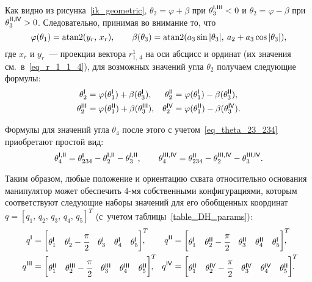 Как видно из рисунка~\ref{ik_geometric}, $\theta_2 = \varphi + \beta$ при $\theta_3^{\mathsf{I,III}} < 0$ и $\theta_2 = \varphi - \beta$ при $\theta_3^{\mathsf{II,IV}} > 0$.
Следовательно, принимая во внимание то, что
\begin{equation}
    \varphi(\theta_1) = \atan2(y_r,\, x_r),
    \qquad
    \beta(\theta_3) = \atan2(a_3\sin|\theta_3|,\: a_2 + a_3\cos|\theta_3|),
\end{equation}
где $x_r$ и $y_r$~--- проекции вектора $r^1_{1,\,4}$ на оси абсцисс и ординат (их значения см.~в~\eqref{eq_r_1_1_4}), для возможных значений угла $\theta_2$ получаем следующие формулы:
\begin{align}
	\theta_2^{\mathsf{I}} &= \varphi(\theta_1^{\mathsf{I}}) + \beta(\theta_3^{\mathsf{I}}), &
	\theta_2^{\mathsf{II}} &= \varphi(\theta_1^{\mathsf{I}}) - \beta(\theta_3^{\mathsf{II}}),\\
	\theta_2^{\mathsf{III}} &= \varphi(\theta_1^{\mathsf{II}}) + \beta(\theta_3^{\mathsf{III}}), &
	\theta_2^{\mathsf{IV}} &= \varphi(\theta_1^{\mathsf{II}}) - \beta(\theta_3^{\mathsf{IV}})\ldotp
\end{align}

Формулы для значений угла $\theta_4$ после этого с учетом~\eqref{eq_theta_23_234} приобретают простой вид:
\begin{equation}
	\theta_4^{\mathsf{I,II}} = \theta_{234}^{\mathsf{I}} - \theta_{2}^{\mathsf{I,II}} - \theta_{3}^{\mathsf{I,II}},
	\qquad
	\theta_4^{\mathsf{III,IV}} = \theta_{234}^{\mathsf{II}} - \theta_{2}^{\mathsf{III, IV}} - \theta_{3}^{\mathsf{III,IV}}\ldotp
\end{equation}

Таким образом, любые положение и ориентацию схвата относительно основания манипулятор может обеспечить 4-мя собственными конфигурациями, которым соответствуют следующие наборы значений для его обобщенных координат $q=\left[q_1,\,q_2,\,q_3,\,q_4,\,q_5\right]^T$ (с~учетом таблицы~\ref{table_DH_params}):
\begin{align}
	q^\msf{I} &=
	\begin{bmatrix}
	    \theta_1^\msf{I} & \theta_2^\msf{I} - \cfrac{\pi}{2} & \theta_3^\msf{I} & \theta_4^\msf{I} & \theta_5^\msf{I}
	\end{bmatrix}^T\!\!\!\!\!,
	&
	q^\msf{II} &=
	\begin{bmatrix}
	    \theta_1^\msf{I} & \theta_2^\msf{II} - \cfrac{\pi}{2} & \theta_3^\msf{II} & \theta_4^\msf{II} & \theta_5^\msf{I}
	\end{bmatrix}^T\!\!\!\!\!,
	\\
	q^\msf{III} &=
	\begin{bmatrix}
	    \theta_1^\msf{II} & \theta_2^\msf{III} - \cfrac{\pi}{2} & \theta_3^\msf{III} & \theta_4^\msf{III} & \theta_5^\msf{II}
	\end{bmatrix}^T\!\!\!\!\!,
	&
	q^\msf{IV} &=
	\begin{bmatrix}
	    \theta_1^\msf{II} & \theta_2^\msf{IV} - \cfrac{\pi}{2} & \theta_3^\msf{IV} & \theta_4^\msf{IV} & \theta_5^\msf{II}
	\end{bmatrix}^T\!\!\!\!\!\ldotp
\end{align}

\newpage

